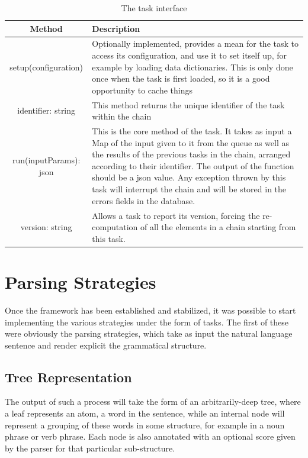 \begin{table}
  \caption{The task interface}
  \label{tab:task_interface}
  
  \begin{center}
    \begin{tabular}{c | l}
      Method & Description\\
      \hline
      setup(configuration) & Optionally implemented, provides a mean for the task to access its configuration, and use it to set itself up, for example by loading data dictionaries. This is only done once when the task is first loaded, so it is a good opportunity to cache things\\
      identifier: string & This method returns the unique identifier of the task within the chain\\
      run(inputParams): json & This is the core method of the task. It takes as input a Map of the input given to it from the queue as well as the results of the previous tasks in the chain, arranged according to their identifier. The output of the function should be a json value. Any exception thrown by this task will interrupt the chain and will be stored in the errors fields in the database.\\
      version: string & Allows a task to report its version, forcing the re-computation of all the elements in a chain starting from this task.\\
    \end{tabular}
  \end{center}
\end{table}

\section{Parsing Strategies} %
\label{sec:parsing_strategies}

Once the framework has been established and stabilized, it was possible to start implementing the various strategies under the form of tasks. The first of these were obviously the parsing strategies, which take as input the natural language sentence and render explicit the grammatical structure.

\subsection{Tree Representation} %
\label{sub:tree_representation}

The output of such a process will take the form of an arbitrarily-deep tree, where a leaf represents an atom, a word in the sentence, while an internal node will represent a grouping of these words in some structure, for example in a noun phrase or verb phrase. Each node is also annotated with an optional score given by the parser for that particular sub-structure.

